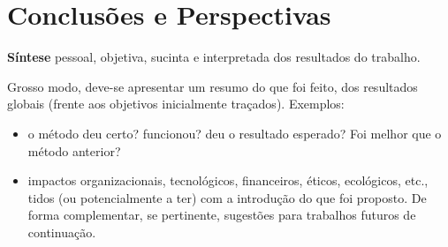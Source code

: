 \chapter{Conclusões e Perspectivas}
\textbf{Síntese} pessoal, objetiva, sucinta e interpretada dos resultados do trabalho.


Grosso modo, deve-se apresentar um resumo do que foi feito, dos resultados globais (frente aos objetivos inicialmente traçados). Exemplos:

\begin{itemize}
\item o método deu certo? funcionou? deu o resultado esperado? Foi melhor que o método anterior?
\item impactos organizacionais, tecnológicos, financeiros, éticos, ecológicos, etc., tidos (ou potencialmente a ter) com a introdução do que foi proposto.
De forma complementar, se pertinente, sugestões para trabalhos futuros de continuação.
\end{itemize}
